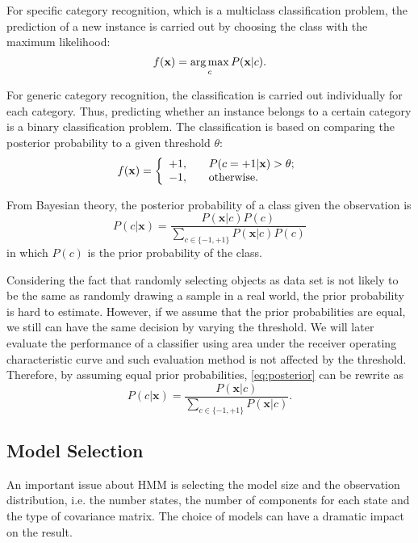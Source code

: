 \documentclass[12pt,final,twoside]{report}
\begin{document}
For specific category recognition, which is a multiclass classification problem, the prediction of a new instance is carried out by choosing the class with the maximum likelihood:
\begin{equation}
  f(\mathbf{x}) = \operatorname*{arg\,max}_{c} P(\mathbf{x}|c) .
\end{equation}

For generic category recognition, the classification is carried out individually for each category. Thus, predicting whether an instance belongs to a certain category is a binary classification problem. The classification is based on comparing the posterior probability to a given threshold $\theta$:
\begin{equation}
  \label{eq:classif}
  f(\mathbf{x}) = 
  \left\{ \begin{array}{l l} +1, & \quad P(c=+1|\mathbf{x}) > \theta; \\ -1, & \quad \text{otherwise.}
  \end{array} \right.
\end{equation}

From Bayesian theory, the posterior probability of a class given the observation is
\begin{equation} \label{eq:posterior}
  P(c|\mathbf{x}) = \frac{P(\mathbf{x}|c)P(c)}{\sum_{c \in \{-1,+1\}} P(\mathbf{x}|c)P(c)}
\end{equation}
in which $P(c)$ is the prior probability of the class.

Considering the fact that randomly selecting objects as data set is not likely to be the same as randomly drawing a sample in a real world, the prior probability is hard to estimate. However, if we assume that the prior probabilities are equal, we still can have the same decision by varying the threshold. We will later evaluate the performance of a classifier using area under the receiver operating characteristic curve and such evaluation method is not affected by the threshold. Therefore, by assuming equal prior probabilities, \cref{eq:posterior} can be rewrite as 
\begin{equation}
  \label{eq:postsimp}
  P(c|\mathbf{x}) = \frac{P(\mathbf{x}|c)}{\sum_{c \in \{-1,+1\}} P(\mathbf{x}|c)} .
\end{equation}

\subsection{Model Selection}
An important issue about HMM is selecting the model size and the observation distribution, i.e. the number states, the number of components for each state and the type of covariance matrix. The choice of models can have a dramatic impact on the result.
\end{document}
